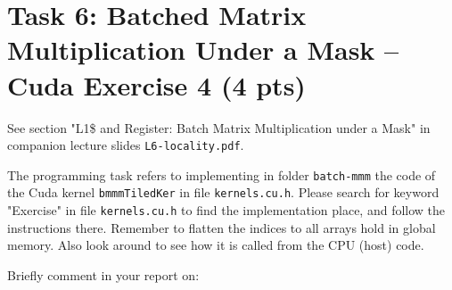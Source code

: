 \documentclass{article}
\begin{document}
\section{Task 6: Batched Matrix Multiplication Under a Mask -- Cuda Exercise 4 (4 pts)}

See section "L1\$ and Register: Batch Matrix Multiplication under a Mask" in companion lecture slides \texttt{L6-locality.pdf}.

The programming task refers to implementing in folder \texttt{batch-mmm} the code of the Cuda kernel \texttt{bmmmTiledKer} in file \texttt{kernels.cu.h}. Please search for keyword "Exercise" in file \texttt{kernels.cu.h} to find the implementation place, and follow the instructions there. Remember to flatten the indices to all arrays hold in global memory. Also look around to see how it is called from the CPU (host) code.

Briefly comment in your report on:
\end{document}
